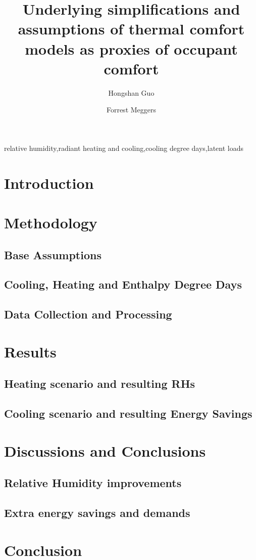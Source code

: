 \documentclass[review]{elsarticle}
\begin{document}
\begin{frontmatter}
\title{Underlying simplifications and assumptions of thermal comfort models as proxies of occupant comfort}
\author[mysecondaryaddress]{Hongshan Guo}
\author[mymainaddress,mysecondaryaddress]{Forrest Meggers}
\address[mymainaddress]{School of Architecture, Princeton University, USA}
\address[mysecondaryaddress]{Andlinger Center for Energy and the Environment, Princeton University, USA.}
\begin{abstract}

\end{abstract}
\begin{keyword}relative humidity\sep radiant heating and cooling\sep cooling degree days\sep latent loads\end{keyword}\end{frontmatter}
\tableofcontents
\section{Introduction}

\section{Methodology}
    \subsection{Base Assumptions}
            
    \subsection{Cooling, Heating and Enthalpy Degree Days}
        
    \subsection{Data Collection and Processing}
        
\section{Results}
    \subsection{Heating scenario and resulting RHs}
    
    \subsection{Cooling scenario and resulting Energy Savings}
    
\section{Discussions and Conclusions}
    \subsection{Relative Humidity improvements}
    
    \subsection{Extra energy savings and demands}
    
\section{Conclusion}


\end{document}
